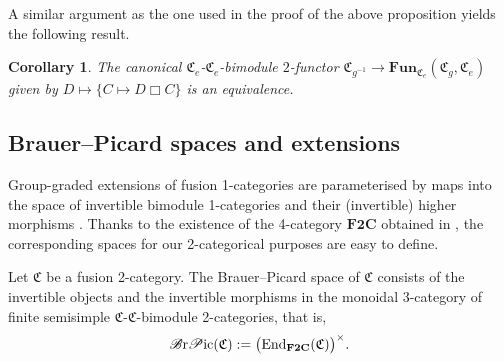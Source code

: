 \documentclass[10pt,a4paper]{amsart}
\newtheorem{Corollary}[Theorem]{Corollary}
\numberwithin{equation}{section}
\begin{document}
A similar argument as the one used in the proof of the above proposition yields the following result.

\begin{Corollary}\label{cor:invertibledual}
The canonical $\mathfrak{C}_e$-$\mathfrak{C}_e$-bimodule $2$-functor $\mathfrak{C}_{g^{-1}}\rightarrow \mathbf{Fun}_{\mathfrak{C}_e}(\mathfrak{C}_g,\mathfrak{C}_e)$ given by $D\mapsto \{C\mapsto D\Box C\}$ is an equivalence.
\end{Corollary}

\subsection{Brauer--Picard spaces and extensions}

Group-graded extensions of fusion 1-categories are parameterised by maps into the space of invertible bimodule 1-categories and their (invertible) higher morphisms \cite{ENO2}. Thanks to the existence of the 4-category $\mathbf{F2C}$ obtained in \cite{D10}, the corresponding spaces for our 2-categorical purposes are easy to define.

\begin{Definition}
Let $\mathfrak{C}$ be a fusion 2-category. The Brauer--Picard space of $\mathfrak{C}$ consists of the invertible objects and the invertible morphisms in the monoidal 3-category of finite semisimple $\mathfrak{C}$-$\mathfrak{C}$-bimodule 2-categories, that is, \begin{gather*}\mathscr{B}{\rm r}\mathscr{P}{\rm ic}(\mathfrak{C}):=\big(\mathbf{\operatorname{End}}_{\mathbf{F2C}}(\mathfrak{C})\big)^{\times}.\end{gather*}
\end{Definition}

\end{document}
